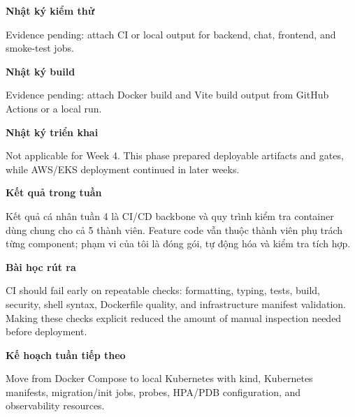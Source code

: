 \vspace{0.5em}\noindent\textbf{Nhật ký kiểm
thử}\par

Evidence pending: attach CI or local output for backend, chat, frontend,
and smoke-test jobs.

\vspace{0.5em}\noindent\textbf{Nhật ký build}\par

Evidence pending: attach Docker build and Vite build output from GitHub
Actions or a local run.

\vspace{0.5em}\noindent\textbf{Nhật ký triển
khai}\par

Not applicable for Week 4. This phase prepared deployable artifacts and
gates, while AWS/EKS deployment continued in later weeks.

\vspace{0.5em}\noindent\textbf{Kết quả trong tuần}\par

Kết quả cá nhân tuần 4 là CI/CD backbone và quy trình kiểm tra container
dùng chung cho cả 5 thành viên. Feature code vẫn thuộc thành viên phụ
trách từng component; phạm vi của tôi là đóng gói, tự động hóa và kiểm
tra tích hợp.

\vspace{0.5em}\noindent\textbf{Bài học rút ra}\par

CI should fail early on repeatable checks: formatting, typing, tests,
build, security, shell syntax, Dockerfile quality, and infrastructure
manifest validation. Making these checks explicit reduced the amount of
manual inspection needed before deployment.

\vspace{0.5em}\noindent\textbf{Kế hoạch tuần tiếp
theo}\par

Move from Docker Compose to local Kubernetes with kind, Kubernetes
manifests, migration/init jobs, probes, HPA/PDB configuration, and
observability resources.
